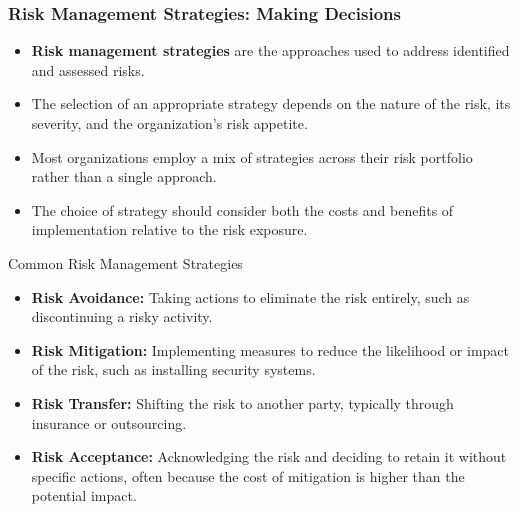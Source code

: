 \documentclass{beamer}
\begin{document}
          \begin{frame}
          \frametitle{Risk Management Strategies: Making Decisions}
          \begin{itemize}
            \item \textbf{Risk management strategies} are the approaches used to address identified and assessed risks.
            \item The selection of an appropriate strategy depends on the nature of the risk, its severity, and the organization's risk appetite.
            \item Most organizations employ a mix of strategies across their risk portfolio rather than a single approach.
            \item The choice of strategy should consider both the costs and benefits of implementation relative to the risk exposure.
          \end{itemize}
          
          \begin{exampleblock}{Common Risk Management Strategies}
            \scriptsize
          \begin{itemize}
            \item \textbf{Risk Avoidance:} Taking actions to eliminate the risk entirely, such as discontinuing a risky activity.
            \item \textbf{Risk Mitigation:} Implementing measures to reduce the likelihood or impact of the risk, such as installing security systems.
            \item \textbf{Risk Transfer:} Shifting the risk to another party, typically through insurance or outsourcing.
            \item \textbf{Risk Acceptance:} Acknowledging the risk and deciding to retain it without specific actions, often because the cost of mitigation is higher than the potential impact.
          \end{itemize}
          \end{exampleblock}
          \end{frame}
          
\end{document}
